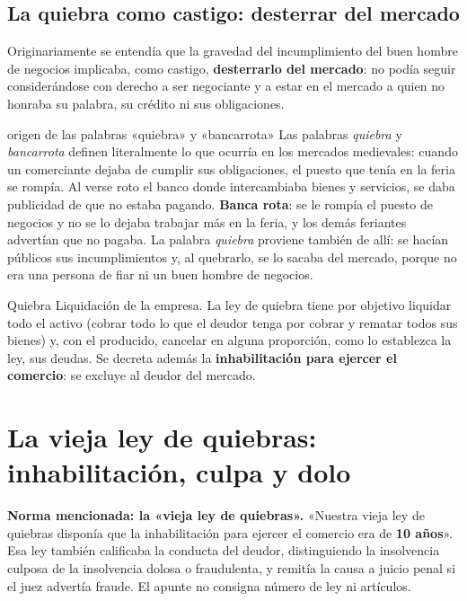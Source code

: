 \documentclass[12pt,oneside]{book}
\begin{document}
\subsection{La quiebra como castigo: desterrar del mercado}

Originariamente se entendía que la gravedad del incumplimiento del buen hombre de negocios implicaba, como castigo, \textbf{desterrarlo del mercado}: no podía seguir considerándose con derecho a ser negociante y a estar en el mercado a quien no honraba su palabra, su crédito ni sus obligaciones.

\begin{example}{origen de las palabras «quiebra» y «bancarrota»}
Las palabras \textit{quiebra} y \textit{bancarrota} definen literalmente lo que ocurría en los mercados medievales: cuando un comerciante dejaba de cumplir sus obligaciones, el puesto que tenía en la feria se rompía. Al verse roto el banco donde intercambiaba bienes y servicios, se daba publicidad de que no estaba pagando. \textbf{Banca rota}: se le rompía el puesto de negocios y no se lo dejaba trabajar más en la feria, y los demás feriantes advertían que no pagaba. La palabra \textit{quiebra} proviene también de allí: se hacían públicos sus incumplimientos y, al quebrarlo, se lo sacaba del mercado, porque no era una persona de fiar ni un buen hombre de negocios.
\end{example}

\begin{definition}{Quiebra}
Liquidación de la empresa. La ley de quiebra tiene por objetivo liquidar todo el activo (cobrar todo lo que el deudor tenga por cobrar y rematar todos sus bienes) y, con el producido, cancelar en alguna proporción, como lo establezca la ley, sus deudas. Se decreta además la \textbf{inhabilitación para ejercer el comercio}: se excluye al deudor del mercado.
\end{definition}

\section{La vieja ley de quiebras: inhabilitación, culpa y dolo}

\begin{note}
\textbf{Norma mencionada: la «vieja ley de quiebras».} «Nuestra vieja ley de quiebras disponía que la inhabilitación para ejercer el comercio era de \textbf{10 años}». Esa ley también calificaba la conducta del deudor, distinguiendo la insolvencia culposa de la insolvencia dolosa o fraudulenta, y remitía la causa a juicio penal si el juez advertía fraude. El apunte no consigna número de ley ni artículos.
\end{note}
\end{document}
